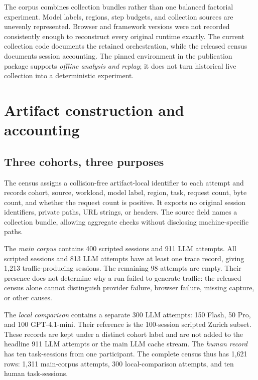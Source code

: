 \documentclass[10pt,sigconf,nonacm]{acmart}
\begin{document}
The corpus combines collection bundles rather than one balanced factorial experiment. Model labels, regions, step budgets, and collection sources are unevenly represented. Browser and framework versions were not recorded consistently enough to reconstruct every original runtime exactly. The current collection code documents the retained orchestration, while the released census documents session accounting. The pinned environment in the publication package supports \emph{offline analysis and replay}; it does not turn historical live collection into a deterministic experiment.

\section{Artifact construction and accounting}
\label{sec:artifact}
\subsection{Three cohorts, three purposes}
The census assigns a collision-free artifact-local identifier to each attempt and records cohort, source, workload, model label, region, task, request count, byte count, and whether the request count is positive. It exports no original session identifiers, private paths, URL strings, or headers. The source field names a collection bundle, allowing aggregate checks without disclosing machine-specific paths.

\begin{table}[t]
\centering\small
\caption{Census accounting. The local LLM comparison and human record are separate from the main corpus. Its scripted reference is the already-counted 100-session Zurich subset.}
\label{tab:cohorts}
\setlength{\tabcolsep}{3pt}
\resizebox{\columnwidth}{!}{}
\end{table}

The \emph{main corpus} contains 400 scripted sessions and 911 LLM attempts. All scripted sessions and 813 LLM attempts have at least one trace record, giving 1{,}213 traffic-producing sessions. The remaining 98 attempts are empty. Their presence does not determine why a run failed to generate traffic: the released census alone cannot distinguish provider failure, browser failure, missing capture, or other causes.

The \emph{local comparison} contains a separate 300 LLM attempts: 150 Flash, 50 Pro, and 100 GPT-4.1-mini. Their reference is the 100-session scripted Zurich subset. These records are kept under a distinct cohort label and are not added to the headline 911 LLM attempts or the main LLM cache stream. The \emph{human record} has ten task-sessions from one participant. The complete census thus has 1{,}621 rows: 1{,}311 main-corpus attempts, 300 local-comparison attempts, and ten human task-sessions.
\end{document}
